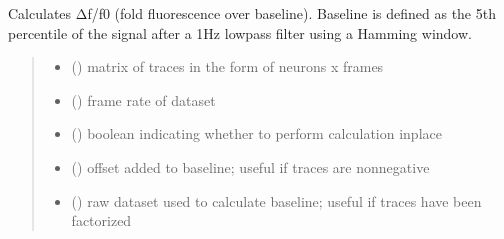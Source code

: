 \documentclass[letterpaper,10pt,english]{sphinxmanual}
\begin{document}
\begin{fulllineitems}
\label{\detokenize{CalSciPy.trace_processing:CalSciPy.trace_processing.calculate_dfof}}
\pysigstartsignatures
{}
\pysigstopsignatures
\sphinxAtStartPar
Calculates Δf/f0 (fold fluorescence over baseline). Baseline is defined as the 5th percentile of the signal
after a 1Hz low\sphinxhyphen{}pass filter using a Hamming window.
\begin{quote}\begin{description}
\begin{itemize}
\item {} 
\sphinxAtStartPar
{} () \sphinxhyphen{}\sphinxhyphen{} matrix of traces in the form of neurons x frames

\item {} 
\sphinxAtStartPar
{} () \sphinxhyphen{}\sphinxhyphen{} frame rate of dataset

\item {} 
\sphinxAtStartPar
{} () \sphinxhyphen{}\sphinxhyphen{} boolean indicating whether to perform calculation in\sphinxhyphen{}place

\item {} 
\sphinxAtStartPar
{} () \sphinxhyphen{}\sphinxhyphen{} offset added to baseline; useful if traces are non\sphinxhyphen{}negative

\item {} 
\sphinxAtStartPar
{} () \sphinxhyphen{}\sphinxhyphen{} raw dataset used to calculate baseline; useful if traces have been factorized


\end{itemize}
\end{description}
\end{quote}
\end{fulllineitems}
\end{document}
